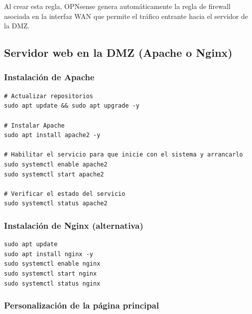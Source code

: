 \documentclass{article}
\renewcommand{\_}{\oldunderscore\hskip0pt\relax}
\begin{document}
Al crear esta regla, OPNsense genera automáticamente la regla de
firewall asociada en la interfaz WAN que permite el tráfico entrante
hacia el servidor de la DMZ.

\hypertarget{servidor-web-en-la-dmz-apache-o-nginx}{%
\subsection{Servidor web en la DMZ (Apache o
Nginx)}\label{servidor-web-en-la-dmz-apache-o-nginx}}

\hypertarget{instalaciuxf3n-de-apache}{%
\subsubsection{Instalación de Apache}\label{instalaciuxf3n-de-apache}}

\begin{Verbatim}[fontsize=\footnotesize,frame=single,rulecolor=\color{codebg},fillcolor=\color{codebg},framesep=2mm,xleftmargin=1mm,xrightmargin=1mm,breaklines=true,breakanywhere=true,breaksymbolleft={},breaksymbolright={}]
# Actualizar repositorios
sudo apt update && sudo apt upgrade -y

# Instalar Apache
sudo apt install apache2 -y

# Habilitar el servicio para que inicie con el sistema y arrancarlo
sudo systemctl enable apache2
sudo systemctl start apache2

# Verificar el estado del servicio
sudo systemctl status apache2
\end{Verbatim}

\hypertarget{instalaciuxf3n-de-nginx-alternativa}{%
\subsubsection{Instalación de Nginx
(alternativa)}\label{instalaciuxf3n-de-nginx-alternativa}}

\begin{Verbatim}[fontsize=\footnotesize,frame=single,rulecolor=\color{codebg},fillcolor=\color{codebg},framesep=2mm,xleftmargin=1mm,xrightmargin=1mm,breaklines=true,breakanywhere=true,breaksymbolleft={},breaksymbolright={}]
sudo apt update
sudo apt install nginx -y
sudo systemctl enable nginx
sudo systemctl start nginx
sudo systemctl status nginx
\end{Verbatim}

\hypertarget{personalizaciuxf3n-de-la-puxe1gina-principal}{%
\subsubsection{Personalización de la página
principal}\label{personalizaciuxf3n-de-la-puxe1gina-principal}}
\end{document}
